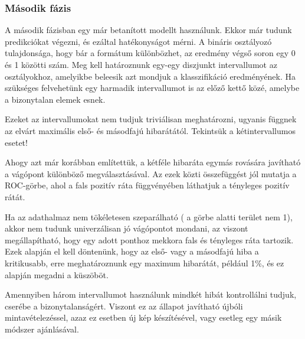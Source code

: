 \subsubsection{Második fázis}
\label{sec:masodik.fazis}

A második fázisban egy már betanított modellt használunk. Ekkor már tudunk predikciókat 
végezni, és ezáltal hatékonyságot mérni. A bináris osztályozó tulajdonsága, hogy bár
a formátum különbözhet, az eredmény végső soron egy 0 és 1 közötti szám. Meg kell 
határoznunk egy-egy diszjunkt intervallumot az osztályokhoz, amelyikbe beleesik azt mondjuk
a klasszifikáció eredményének. Ha szükséges felvehetünk egy harmadik intervallumot is 
az előző kettő közé, amelybe a bizonytalan elemek esnek.


Ezeket az intervallumokat nem tudjuk triviálisan meghatározni, ugyanis függnek az 
elvárt maximális első- és másodfajú hibarátától. Tekintsük a kétintervallumos esetet!

Ahogy azt már korábban említettük, a kétféle hibaráta egymás rovására javítható a 
vágópont különböző megválasztásával. Az ezek közti összefüggést jól mutatja a 
ROC-görbe, ahol a fals pozitív ráta függvényében láthatjuk a tényleges
pozitív rátát.



%	

Ha az adathalmaz nem tökéletesen szeparálható ( a görbe alatti terület nem 1), akkor
nem tudunk univerzálisan jó vágópontot mondani, az viszont megállapítható, hogy egy adott ponthoz 
mekkora fals és tényleges ráta tartozik. Ezek alapján el kell döntenünk, hogy az 
első- vagy a másodfajú hiba a kritikusabb, erre meghatároznunk egy maximum hibarátát,
például 1\%, és ez alapján megadni a küszöböt.


Amennyiben három intervallumot használunk mindkét hibát kontrollálni tudjuk, cserébe a 
bizonytalanságért. Viszont ez az állapot javítható újbóli mintavételezéssel, azaz 
ez esetben új kép készítésével, vagy esetleg egy másik módszer ajánlásával.













